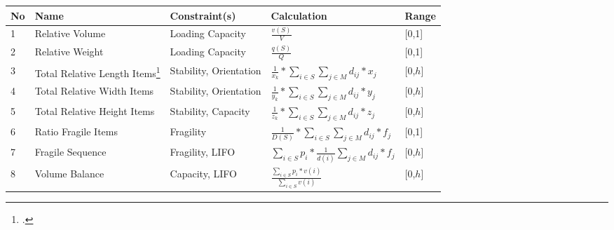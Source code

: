 \begin{table}[ht]
    \centering
    \renewcommand{\arraystretch}{2.0}
    \begin{tabular}{@{}P{0.08\textwidth}P{0.16\textwidth}P{0.26\textwidth}P{0.28\textwidth}@{}P{0.1\textwidth}@{}}
        \toprule
        No & Name                                                                                            & Constraint(s)          & Calculation                                                                                       & Range   \\
          & Relative Volume                                                                                 & Loading Capacity       & $\displaystyle\frac{v(S)}{V}$                                                                     & [0,1]   \\
        2  & Relative Weight                                                                                 & Loading Capacity       & $\displaystyle\frac{q(S)}{Q}$                                                                     & [0,1]   \\
        3  & Total Relative Length Items\footcite[Feature is adapted from][p.21]{sarah_de_wolf_machine_2022} & Stability, Orientation & $\displaystyle\frac{1}{x_k} * \sum_{i \in S}\sum_{j \in M} d_{ij} * x_j$                          & [0,$h$] \\
        4  & Total Relative Width Items \footnotemark[\value{footnote}]                                      & Stability, Orientation & $\displaystyle\frac{1}{y_k} * \sum_{i \in S}\sum_{j \in M} d_{ij} * y_j$                          & [0,$h$] \\
        5  & Total Relative Height Items  \footnotemark[\value{footnote}]                                    & Stability, Capacity    & $\displaystyle\frac{1}{z_k} * \sum_{i \in S}\sum_{j \in M} d_{ij} * z_j$                          & [0,$h$] \\
        6  & Ratio Fragile Items                                                                             & Fragility              & $\displaystyle\frac{1}{D(S)} * \sum_{i \in S}\sum_{j \in M} d_{ij} * f_j$                         & [0,1]   \\
        7  & Fragile Sequence                                                                                & Fragility, \gls{LIFO}  & $\displaystyle\sum_{i \in S}p_i * \frac{1}{d(i)}\sum_{j\in M} d_{ij}*f_j $                        & [0,$h$] \\
        8  & Volume Balance                                                                                  & Capacity, \gls{LIFO}   & $\frac{\displaystyle\sum\nolimits_{i \in S}p_i * v(i)}{\displaystyle\sum\nolimits_{i \in S}v(i)}$ & [0,$h$] \\

\end{tabular}
\end{table}
